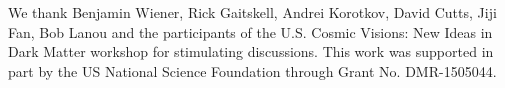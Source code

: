 \documentclass[10pt, letterpaper, reprint, superscriptaddress, aps, prl]
{revtex4-1} \usepackage[latin1]{inputenc}
\begin{document}
\begin{acknowledgments}
We thank Benjamin Wiener, Rick Gaitskell, Andrei Korotkov, David Cutts, Jiji Fan, Bob Lanou and the participants of the U.S. Cosmic Visions: New Ideas in Dark Matter workshop for stimulating discussions. This work was supported in part by the US National Science Foundation through Grant No. DMR-1505044. 
\end{acknowledgments}


\end{document}
